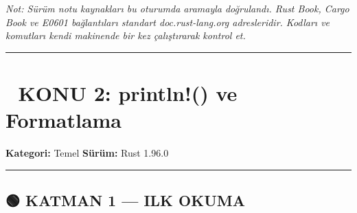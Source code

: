 \documentclass[12pt,a4paper]{article}
\begin{document}
\emph{Not: Sürüm notu kaynakları bu oturumda aramayla doğrulandı. Rust Book, Cargo Book ve E0601 bağlantıları standart doc.rust-lang.org adresleridir. Kodları ve komutları kendi makinende bir kez çalıştırarak kontrol et.}

\begin{center}\rule{0.5\linewidth}{0.5pt}\end{center}

\section{📘 KONU 2: println!() ve Formatlama}\label{konu-2-println-ve-formatlama}

\textbf{Kategori:} Temel \textbar{} \textbf{Sürüm:} Rust 1.96.0

\begin{center}\rule{0.5\linewidth}{0.5pt}\end{center}

\subsection{🟢 KATMAN 1 --- ILK OKUMA}\label{katman-1-—-ilk-okuma-1}
\end{document}
